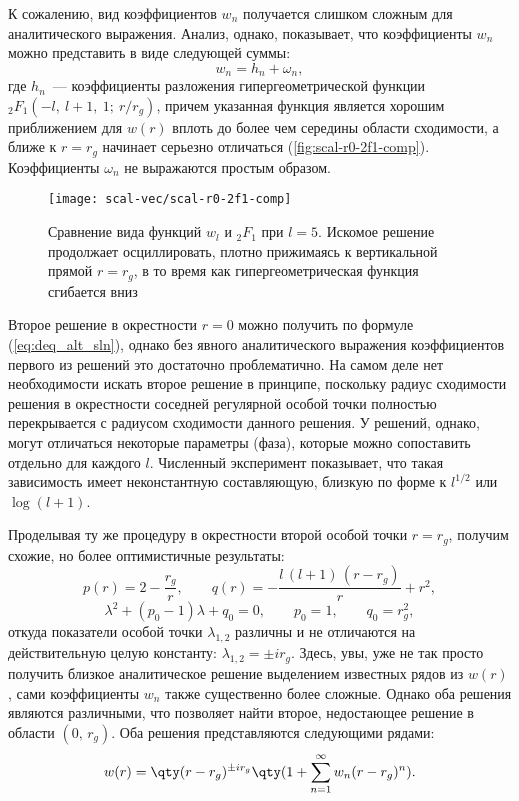 \documentclass[\docroot/reports/draft/report.tex]{subfiles}
\begin{document}
        К сожалению, вид коэффициентов $w_n$ получается слишком сложным для аналитического выражения. Анализ, однако, показывает, что коэффициенты $w_n$ можно представить в виде следующей суммы:
        \begin{equation*}
            w_n = h_n + \omega_n,
        \end{equation*}
        где $h_n$~--- коэффициенты разложения гипергеометрической функции ${}_2F_1(-l,\ l+1,\ 1;\ r / r_g)$, причем указанная функция является хорошим приближением для $w(r)$ вплоть до более чем середины области сходимости, а ближе к $r = r_g$ начинает серьезно отличаться (\autoref{fig:scal-r0-2f1-comp}). Коэффициенты $\omega_n$ не выражаются простым образом.
        \begin{figure}[!htb]%
            \centering\texttt{[image: scal-vec/scal-r0-2f1-comp]}%
            \caption[]{Сравнение вида функций $w_l$ и ${}_2F_1$ при $l = 5$. Искомое решение продолжает осциллировать, плотно прижимаясь к вертикальной прямой $r = r_g$, в то время как гипергеометрическая функция сгибается вниз}%
            \label{fig:scal-r0-2f1-comp}%
        \end{figure}

        Второе решение в окрестности $r = 0$ можно получить по формуле (\ref{eq:deq_alt_sln}), однако без явного аналитического выражения коэффициентов первого из решений это достаточно проблематично. На самом деле нет необходимости искать второе решение в принципе, поскольку радиус сходимости решения в окрестности соседней регулярной особой точки полностью перекрывается с радиусом сходимости данного решения. У решений, однако, могут отличаться некоторые параметры (фаза), которые можно сопоставить отдельно для каждого $l$. Численный эксперимент показывает, что такая зависимость имеет неконстантную составляющую, близкую по форме к $l^{1/2}$ или $\log(l+1)$.

        Проделывая ту же процедуру в окрестности второй особой точки $r = r_g$, получим схожие, но более оптимистичные результаты:
        \begin{equation*}
            p(r) = 2 - \frac{r_g}{r}, \qquad
            q(r) = -\frac{l\,(l+1)\,(r - r_g)}{r} + r^2 ,
        \end{equation*}
        \begin{equation*}
            \lambda^2 + (p_0 - 1) \lambda + q_0 = 0, \qquad
            p_0 = 1, \qquad q_0 = r_g^2 ,
        \end{equation*}
        откуда показатели особой точки $\lambda_{1,2}$ различны и не отличаются на действительную целую константу: $\lambda_{1,2} = \pm i r_g$. Здесь, увы, уже не так просто получить близкое аналитическое решение выделением известных рядов из $w(r)$, сами коэффициенты $w_n$ также существенно более сложные. Однако оба решения являются различными, что позволяет найти второе, недостающее решение в области $(0,\,r_g)$. Оба решения представляются следующими рядами:
        \begin{equation*}
            w(r) = \qty(r-r_g)^{\pm i r_g} \qty(1 + \sum\limits_{n = 1}^\infty w_n (r - r_g)^n) .
        \end{equation*}
\end{document}

